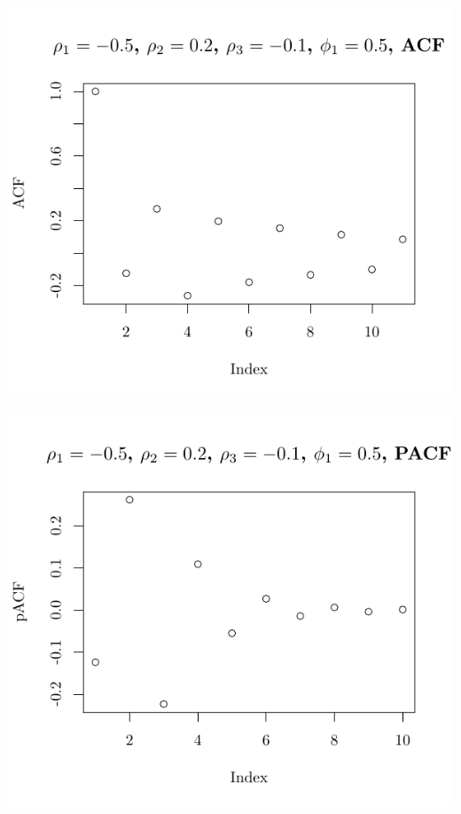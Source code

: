 \documentclass[10pt]{paper}\usepackage[]{graphicx}\usepackage[]{color}
\makeatletter
\def\maxwidth{ %
  \ifdim\Gin@nat@width>\linewidth
    \linewidth
  \else
    \Gin@nat@width
  \fi
}
\newenvironment{knitrout}{}{} %
\makeatother
\begin{document}
\begin{knitrout}
{\centering \includegraphics[width=\maxwidth]{figure/graphics-plotter-123} 

}




{\centering \includegraphics[width=\maxwidth]{figure/graphics-plotter-124} 

}





\end{knitrout}
\end{document}
